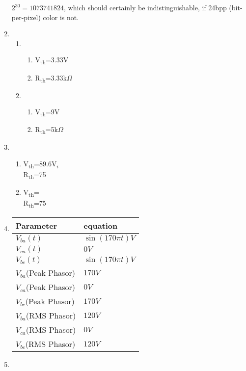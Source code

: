 \documentclass{article}
\begin{document}
\begin{enumerate}
    $2^{30} = 1073741824$, which should certainly be indistinguishable, if 
    24bpp (bit-per-pixel) color is not.
  \item
    \begin{enumerate}
      \item 
        \begin{enumerate}
          \item V\textsubscript{th}=3.33V
          \item R\textsubscript{th}=3.33k$\Omega$
        \end{enumerate}
      \item
        \begin{enumerate}
          \item V\textsubscript{th}=9V
          \item R\textsubscript{th}=5k$\Omega$
        \end{enumerate}
    \end{enumerate}
  \item
    \begin{enumerate}
      \item
        V\textsubscript{th}=89.6V$_i$ \\
        R\textsubscript{th}=75
      \item
        V\textsubscript{th}= \\
        R\textsubscript{th}=75
    \end{enumerate} 
  \item 
    \begin{tabular}{ l | l }
      Parameter & equation \\ \hline
        $V_{ba}(t)$ & $\sin(170 \pi t)V$ \\ \hline
        $V_{ca}(t)$ & $0V$ \\ \hline
        $V_{bc}(t)$ & $\sin(170 \pi t)V$ \\ \hline
        $V_{ba}$(Peak Phasor) & $170V$ \\ \hline
        $V_{ca}$(Peak Phasor) & $0V$ \\ \hline
        $V_{bc}$(Peak Phasor) & $170V$ \\ \hline
        $V_{ba}$(RMS Phasor) & $120V$ \\ \hline
        $V_{ca}$(RMS Phasor) & $0V$ \\ \hline
        $V_{bc}$(RMS Phasor) & $120V$ \\ \hline
    \end{tabular}
  \item
    \begin{enumerate}

\end{enumerate}
\end{enumerate}
\end{document}

